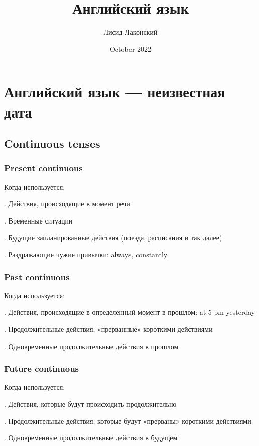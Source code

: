 \documentclass{article}
\title{Английский язык}
\author{Лисид Лаконский}
\date{October 2022}
\begin{document}
\maketitle
\tableofcontents
\pagebreak

\section{Английский язык — неизвестная дата}

\subsection{Continuous tenses}

\subsubsection{Present continuous}

\noindent Когда используется:

. Действия, происходящие в момент речи

. Временные ситуации

. Будущие запланированные действия (поезда, расписания и так далее)

. Раздражающие чужие привычки: always, constantly

\subsubsection{Past continuous}

\noindent Когда используется:

. Действия, происходящие в определенный момент в прошлом: at 5 pm yesterday

. Продолжительные действия, «прерванные» короткими действиями

. Одновременные продолжительные действия в прошлом


\subsubsection{Future continuous}

\noindent Когда используется:

. Действия, которые будут происходить продолжительно

. Продолжительные действия, которые будут «прерваны» короткими действиями

. Одновременные продолжительные действия в будущем
\end{document}
